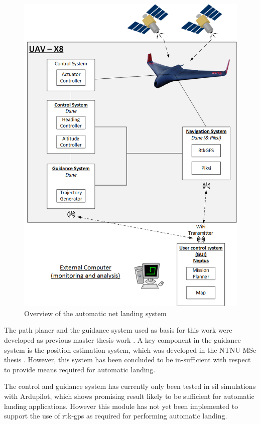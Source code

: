 \begin{figure}[H]
	\centering
		\includegraphics[width=1\textwidth]{figs/System.png}
		\caption{Overview of the automatic net landing system}
		\label{figure:SystemOverview}
\end{figure}

The path planer and the guidance system used as basis for this work were developed as previous master thesis work \citep{Froelich}. A key component in the guidance system is the position estimation system, which was developed in the NTNU MSc thesis \citep{Spockeli}. However, this system has been concluded to be in-sufficient with respect to provide means required for automatic landing.

The control and guidance system has currently only been tested in \gls{sil} simulations with Ardupilot, which shows promising result likely to be sufficient for automatic landing applications. However this module has not yet been implemented to support the use of \gls{rtk-gps} as required for performing automatic landing.

